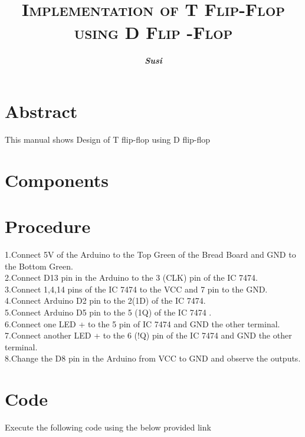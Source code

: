 \documentclass{article}
\title{\textbf{\textsc{Implementation of T Flip-Flop using D Flip -Flop}}}
\author{\textit{\textbf{Susi}}}
\begin{document}
\maketitle
\section{Abstract}
This manual shows Design of T flip-flop using D flip-flop
\section{Components}
\begin{table}[ht]
\caption{}
\label{Tabel-1}
\end{table}
\section{Procedure}
1.Connect 5V  of the Arduino to the Top Green of the Bread Board  and GND to the Bottom Green.
\\
2.Connect D13 pin in the Arduino to the 3 (CLK) pin of the IC 7474.
\\
3.Connect 1,4,14  pins of the IC 7474 to the VCC and 7 pin to the GND.
\\
4.Connect  Arduino D2 pin to the  2(1D) of the IC 7474.
\\
5.Connect Arduino D5 pin to the 5 (1Q) of the IC 7474 .
\\
6.Connect one LED + to the 5 pin of IC 7474 and GND the other terminal.
\\
7.Connect another LED +  to the 6 (!Q) pin of the IC 7474 and GND the other terminal.
\\
8.Change the D8 pin in the Arduino  from VCC to GND and observe the outputs.
\\

\section{Code}
Execute the following code using the below provided link
\\
\begin{table}[ht]
\end{table}
\end{document}
